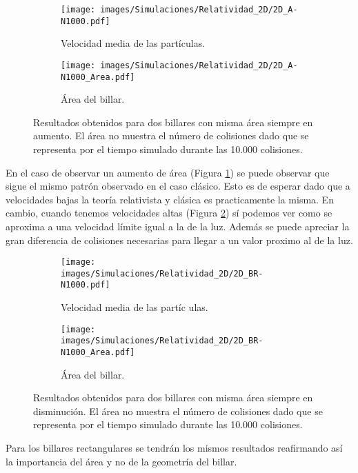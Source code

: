 \begin{figure}[h]
    \begin{subfigure}[b]{0.5\textwidth}
        \centering
        \texttt{[image: images/Simulaciones/Relatividad\_2D/2D\_A-N1000.pdf]}
        \caption{Velocidad media de las partículas.}
    \end{subfigure}
    \hfill
    \begin{subfigure}[b]{0.5\textwidth}
        \centering
        \texttt{[image: images/Simulaciones/Relatividad\_2D/2D\_A-N1000\_Area.pdf]}
        \caption{Área del billar.}
    \end{subfigure}
    \caption{Resultados obtenidos para dos billares con misma área siempre en aumento. El área no muestra el número de colisiones dado que se representa por el tiempo simulado durante las 10.000 colisiones.}
    \label{fig:2DR_A-N1000_con_Area}
\end{figure}

En el caso de observar un aumento de área (Figura \ref{fig:2DR_A-N1000_con_Area}) se puede observar que sigue el mismo patrón observado en el caso clásico. Esto es de esperar dado que a velocidades bajas la teoría relativista y clásica es practicamente la misma. En cambio, cuando tenemos velocidades altas (Figura \ref{fig:2DR_BR-N1000_con_Area}) sí podemos ver como se aproxima a una velocidad límite igual a la de la luz. Además se puede apreciar la gran diferencia de colisiones necesarias para llegar a un valor proximo al de la luz. 

\begin{figure}[H]
    \begin{subfigure}[b]{0.5\textwidth}
        \centering
        \texttt{[image: images/Simulaciones/Relatividad\_2D/2D\_BR-N1000.pdf]}
        \caption{Velocidad media de las partíc  ulas.}
    \end{subfigure}
    \hfill
    \begin{subfigure}[b]{0.5\textwidth}
        \centering
        \texttt{[image: images/Simulaciones/Relatividad\_2D/2D\_BR-N1000\_Area.pdf]}
        \caption{Área del billar.}
    \end{subfigure}
    \caption{Resultados obtenidos para dos billares con misma área siempre en disminución. El área no muestra el número de colisiones dado que se representa por el tiempo simulado durante las 10.000 colisiones.}
    \label{fig:2DR_BR-N1000_con_Area}
\end{figure}

Para los billares rectangulares se tendrán los mismos resultados reafirmando así la importancia del área y no de la geometría del billar. 


